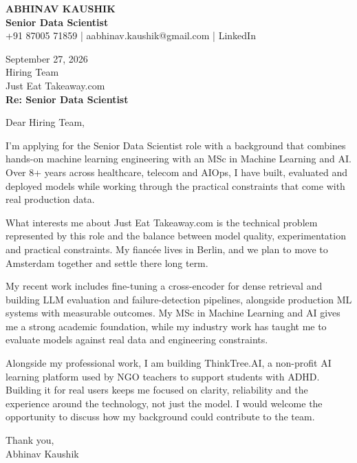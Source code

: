 \documentclass[10pt,a4paper]{article}
\begin{document}
\begin{center}
{\Large\bfseries ABHINAV KAUSHIK}\\[2pt]
{\bfseries Senior Data Scientist}\\[2pt]
+91 87005 71859 \quad | \quad aabhinav.kaushik@gmail.com \quad | \quad LinkedIn
\end{center}
\vspace{8pt}
September 27, 2026\\[6pt]
Hiring Team\\
Just Eat Takeaway.com\\[4pt]
\textbf{Re: Senior Data Scientist}

Dear Hiring Team,

I’m applying for the Senior Data Scientist role with a background that combines hands-on machine learning engineering with an MSc in Machine Learning and AI. Over 8+ years across healthcare, telecom and AIOps, I have built, evaluated and deployed models while working through the practical constraints that come with real production data.

What interests me about Just Eat Takeaway.com is the technical problem represented by this role and the balance between model quality, experimentation and practical constraints. My fiancée lives in Berlin, and we plan to move to Amsterdam together and settle there long term.

My recent work includes fine-tuning a cross-encoder for dense retrieval and building LLM evaluation and failure-detection pipelines, alongside production ML systems with measurable outcomes. My MSc in Machine Learning and AI gives me a strong academic foundation, while my industry work has taught me to evaluate models against real data and engineering constraints.

Alongside my professional work, I am building ThinkTree.AI, a non-profit AI learning platform used by NGO teachers to support students with ADHD. Building it for real users keeps me focused on clarity, reliability and the experience around the technology, not just the model. I would welcome the opportunity to discuss how my background could contribute to the team.

Thank you,\\
Abhinav Kaushik
\end{document}
